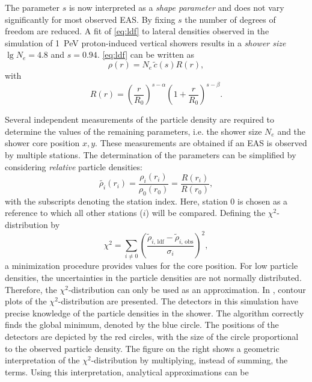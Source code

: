 The parameter $s$ is now interpreted as a \emph{shape parameter} and does not
vary significantly for most observed EAS. By fixing $s$ the number of degrees of
freedom are reduced.  A fit of \eqref{eq:ldf} to lateral densities observed
in the simulation of \SI{1}{\peta\electronvolt} proton-induced
vertical showers results in a \emph{shower size} $\lg N_e = 4.8$ and $s =
\num{0.94}$. \eqref{eq:ldf} can be written as
\begin{equation}
\rho(r) = N_e\, \tilde{c}(s) R(r),
\end{equation}
with
\begin{equation}
R(r) = \left(\frac{r}{R_0}\right)^{s - \alpha} \left(1 +
\frac{r}{R_0}\right)^{s - \beta}.
\end{equation}

Several independent measurements of the particle density are required to
determine the values of the remaining parameters, i.e. the shower size $N_e$ and
the shower core position $x, y$. These measurements are obtained if an EAS is
observed by multiple \hisparc stations. The determination of the
parameters can be simplified by considering \emph{relative}
particle densities:
\begin{equation}
\tilde{\rho_i}(r_i) = \frac{\rho_i(r_i)}{\rho_0(r_0)} = \frac{R(r_i)}{R(r_0)},
\end{equation}
with the subscripts denoting the station index. Here, station 0 is
chosen as a reference to which all other stations ($i$) will be compared.
Defining the $\chi^2$-distribution by
\begin{equation}
\chi^2 = \sum_{i\neq 0}\left(\frac{\tilde\rho_{i,\,\mathrm{ldf}} -
\tilde\rho_{i,\,\mathrm{obs}}}{\sigma_i}\right)^2,
\end{equation}
a minimization procedure provides values for the core position. For low
particle densities, the uncertainties in the particle densities are
not normally distributed. Therefore, the $\chi^2$-distribution can only be
used as an approximation. In , contour plots of the
$\chi^2$-distribution are presented.  The detectors in this simulation have
precise knowledge of the particle densities in the shower. The algorithm
correctly finds the global minimum, denoted by the blue circle. The positions of the
detectors are depicted by the red circles, with the size of the circle
proportional to the observed particle density. The figure on the right shows a
geometric interpretation of the $\chi^2$-distribution by multiplying, instead of
summing, the terms. Using this interpretation, analytical approximations can be
